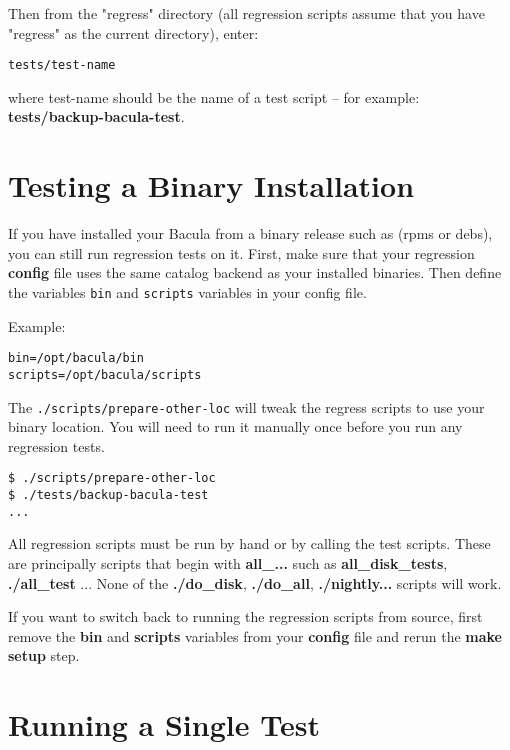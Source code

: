 Then from the "regress" directory (all regression scripts assume that
you have "regress" as the current directory), enter:

\begin{verbatim}
tests/test-name
\end{verbatim}

where test-name should be the name of a test script -- for example:
{\bf tests/backup-bacula-test}.

\section{Testing a Binary Installation}

If you have installed your Bacula from a binary release such as (rpms or debs),
you can still run regression tests on it.
First, make sure that your regression {\bf config} file uses the same catalog backend as
your installed binaries. Then define the variables \texttt{bin} and \texttt{scripts} variables
in your config file.

Example:
\begin{verbatim}
bin=/opt/bacula/bin
scripts=/opt/bacula/scripts
\end{verbatim}

The \texttt{./scripts/prepare-other-loc} will tweak the regress scripts to use
your binary location. You will need to run it manually once before you run any
regression tests.

\begin{verbatim}
$ ./scripts/prepare-other-loc
$ ./tests/backup-bacula-test
...
\end{verbatim}

All regression scripts must be run by hand or by calling the test scripts.  
These are principally scripts that begin with {\bf all\_...} such as {\bf all\_disk\_tests},
{\bf ./all\_test} ...
None of the 
{\bf ./do\_disk}, {\bf ./do\_all}, {\bf ./nightly...}  scripts will work.

If you want to switch back to running the regression scripts from source, first
remove the {\bf bin} and {\bf scripts} variables from your {\bf config} file and
rerun the {\bf make setup} step.

\section{Running a Single Test}


